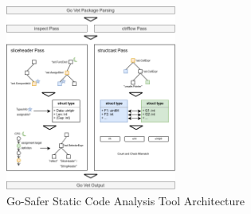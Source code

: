 \begin{figure}[!t]
    \includegraphics[width=0.5\textwidth]{gfx/figures/go-safer-architecture.png}
    \caption{Go-Safer Static Code Analysis Tool Architecture}
    \label{fig:safer-architecture}
\end{figure}
